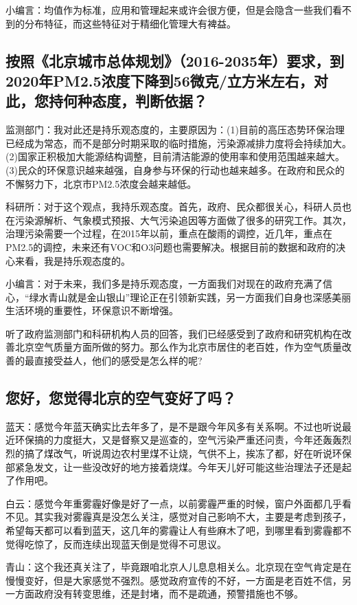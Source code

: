 \documentclass[]{book}
\begin{document}
小编言：均值作为标准，应用和管理起来或许会很方便，但是会隐含一些我们看不到的分布特征，而这些特征对于精细化管理大有裨益。

\subsection{按照《北京城市总体规划》（2016-2035年）要求，到2020年PM2.5浓度下降到56微克/立方米左右，对此，您持何种态度，判断依据？}\label{2016-20352020pm2.556}

监测部门：我对此还是持乐观态度的，主要原因为：(1)目前的高压态势环保治理已经成为常态，而不是部分时期采取的临时措施，污染源减排力度将会持续加大。(2)国家正积极加大能源结构调整，目前清洁能源的使用率和使用范围越来越大。(3)民众的环保意识越来越强，自身参与环保的行动也越来越多。在政府和民众的不懈努力下，北京市PM2.5浓度会越来越低。

科研所：对于这个观点，我持乐观态度。首先，政府、民众都很关心，科研人员也在污染源解析、气象模式预报、大气污染追因等方面做了很多的研究工作。其次，治理污染需要一个过程，在2015年以前，重点在酸雨的调控，近几年，重点在PM2.5的调控，未来还有VOC和O3问题也需要解决。根据目前的数据和政府的决心来看，我是持乐观态度的。

小编言：对于未来，我们多是持乐观态度，一方面我们对现在的政府充满了信心，``绿水青山就是金山银山''理论正在引领新实践，另一方面我们自身也深感美丽生活环境的重要性，环保意识不断增强。

听了政府监测部门和科研机构人员的回答，我们已经感受到了政府和研究机构在改善北京空气质量方面所做的努力。那么作为北京市居住的老百姓，作为空气质量改善的最直接受益人，他们的感受是怎么样的呢?

\subsection{您好，您觉得北京的空气变好了吗？}

蓝天：感觉今年蓝天确实比去年多了，是不是跟今年风多有关系啊。不过也听说最近环保搞的力度挺大，又是督察又是巡查的，空气污染严重还问责，今年还轰轰烈烈的搞了煤改气，听说周边农村里煤不让烧，气供不上，挨冻了都，好在听说环保部紧急发文，让一些没改好的地方接着烧煤。今年天儿好可能这些治理法子还是起了作用吧。

白云：感觉今年重雾霾好像是好了一点，以前雾霾严重的时候，窗户外面都几乎看不见。其实我对雾霾真是没怎么关注，感觉对自己影响不大，主要是考虑到孩子，希望每天都可以看到蓝天，这几年的雾霾让人有些麻木了吧，到哪里看到雾霾都不觉得吃惊了，反而连续出现蓝天倒是觉得不可思议。

青山：这个我还真关注了，毕竟跟咱北京人儿息息相关么。北京现在空气肯定是在慢慢变好，但是大家感觉不强烈。感觉政府宣传的不好，一方面是老百姓不信，另一方面政府没有转变思维，还是封堵，而不是疏通，预警措施也不够。
\end{document}
